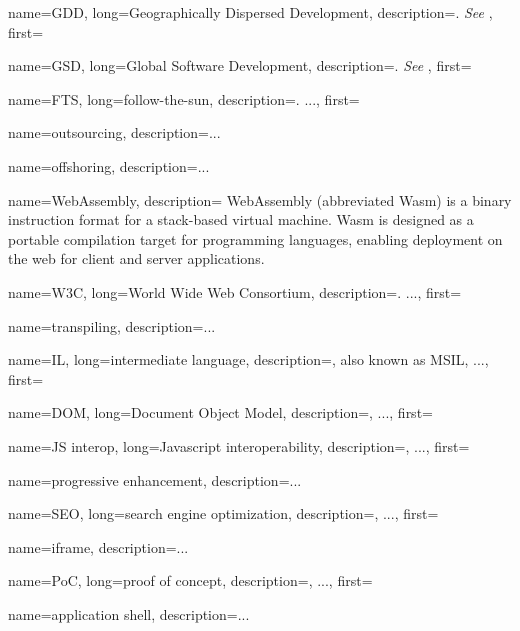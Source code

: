 {
    name=GDD,
    long={Geographically Dispersed Development},
    description={. \textit{See} },
    first=
}

{
    name=GSD,
    long={Global Software Development},
    description={. \textit{See} },
    first=
}

{
    name=FTS,
    long={follow-the-sun},
    description={. ...}, %
    first=
}

{
    name=outsourcing, 
    description={...} %
}

{
    name=offshoring, 
    description={...} %
}

{
    name=WebAssembly, 
    description={
        WebAssembly (abbreviated Wasm) is a binary instruction format for a
        stack-based virtual machine. Wasm is designed as a portable compilation
        target for programming languages, enabling deployment on the web for client
        and server applications.\autocite{Webassembly_2021}
    }
}

{
    name=W3C,
    long={World Wide Web Consortium},
    description={. ...},%
    first=
}

{
    name=transpiling, 
    description={...} %
}

{
    name=IL,
    long={intermediate language},
    description={, also known as MSIL, ...},%
    first=
}

{
    name=DOM,
    long={Document Object Model},
    description={, ...},%
    first=
}

{
    name={JS interop},
    long={Javascript interoperability},
    description={, ...},%
    first=
}

{
    name={progressive enhancement},
    description={...}%
}

{
    name=SEO,
    long={search engine optimization},
    description={, ...},%
    first=
}

{
    name=iframe,
    description={...}%
}

{
    name=PoC,
    long={proof of concept},
    description={, ...},%
    first=
}

{
    name={application shell},
    description={...}%
}